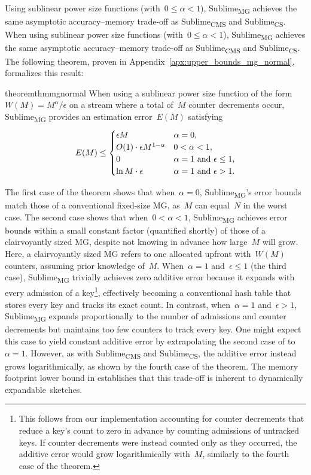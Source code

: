 \documentclass[sigconf]{acmart}
\newcommand{\sketch}{Sublime}
\newcommand{\sketchcms}{\sketch\textsubscript{CMS}\xspace}
\newcommand{\sketchcs}{\sketch\textsubscript{CS}\xspace}
\newcommand{\sketchmg}{\sketch\textsubscript{MG}\xspace}
\begin{document}
\iftods
Using sublinear power size functions (with~$0 \leq \alpha < 1$), \sketchmg achieves the same asymptotic accuracy--memory trade-off as \sketchcms and \sketchcs.
\else
When using sublinear power size functions (with~$0 \leq \alpha < 1$), \sketchmg achieves the same asymptotic accuracy--memory trade-off as \sketchcms and \sketchcs.
\fi
The following theorem, proven in Appendix~\ref{apx:upper_bounds_mg_normal}, formalizes this result:
\begin{restatable}{theorem}{thmmgnormal}
    \label{thm:mg-normal} 
    When using a sublinear power size function of the form~$W(M)=M^\alpha/\epsilon$ on a stream where a total of~$M$ counter decrements occur, \sketchmg provides an estimation error~$E(M)$ satisfying
    $$
    E(M) \leq  
    \begin{cases}
        \epsilon M & \text{$\alpha=0$,} \\
        O(1) \cdot \epsilon {M}^{1-\alpha} & \text{$0<\alpha<1$,} \\
        0 & \text{$\alpha=1$ \textup{and} $\epsilon \leq 1$,} \\
        \ln M \cdot \epsilon & \text{$\alpha=1$ \textup{and} $\epsilon>1$.}
    \end{cases}
    $$
\end{restatable}
\noindent
The first case of the theorem shows that when~$\alpha=0$, \sketchmg's error bounds match those of a conventional fixed-size MG, as~$M$ can equal~$N$ in the worst case.
The second case shows that when~$0<\alpha<1$, \sketchmg achieves error bounds within a small constant factor (quantified shortly) of those of a clairvoyantly sized MG, despite not knowing in advance how large~$M$ will grow.
Here, a clairvoyantly sized MG refers to one allocated upfront with~$W(M)$ counters, assuming prior knowledge of~$M$.
When~$\alpha=1$ and~$\epsilon\leq1$ (the third case), \sketchmg trivially achieves zero additive error because it expands with every admission of a key\footnote{
    This follows from our implementation accounting for counter decrements that reduce a key's count to zero in advance by counting admissions of untracked keys.
    If counter decrements were instead counted only as they occurred, the additive error would grow logarithmically with~$M$, similarly to the fourth case of the theorem.
}, effectively becoming a conventional hash table that stores every key and tracks its exact count.
In contrast, when~$\alpha=1$ and~$\epsilon>1$, \sketchmg expands proportionally to the number of admissions and counter decrements but maintains too few counters to track every key.
One might expect this case to yield constant additive error by extrapolating the second case of  to~$\alpha=1$.
However, as with \sketchcms and \sketchcs, the additive error instead grows logarithmically, as shown by the fourth case of the theorem.
The memory footprint lower bound in  establishes that this trade-off is inherent to dynamically expandable~sketches.
\end{document}
